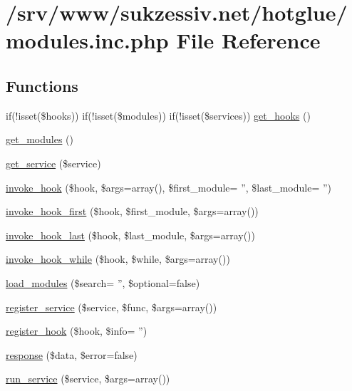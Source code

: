 \hypertarget{modules_8inc_8php}{
\section{/srv/www/sukzessiv.net/hotglue/modules.inc.php File Reference}
\label{modules_8inc_8php}
}
\subsection*{Functions}
\begin{DoxyCompactItemize}
\item 
if(!isset(\$hooks)) if(!isset(\$modules)) if(!isset(\$services)) \hyperlink{modules_8inc_8php_adcaa12e356133b7fa0670571698b38cc}{get\_\-hooks} ()
\item 
\hyperlink{modules_8inc_8php_a1b73e435e11b07906d0781b146b4aa21}{get\_\-modules} ()
\item 
\hyperlink{modules_8inc_8php_abf7633223c2fd4ecb199a8e0dc070802}{get\_\-service} (\$service)
\item 
\hyperlink{modules_8inc_8php_a92ef7c094f294cfec43a3bb53227a21a}{invoke\_\-hook} (\$hook, \$args=array(), \$first\_\-module= '', \$last\_\-module= '')
\item 
\hyperlink{modules_8inc_8php_acac937809bdb98ce29616134e43050ed}{invoke\_\-hook\_\-first} (\$hook, \$first\_\-module, \$args=array())
\item 
\hyperlink{modules_8inc_8php_ae1ff036fae9d272fe1d58dff8a9caed2}{invoke\_\-hook\_\-last} (\$hook, \$last\_\-module, \$args=array())
\item 
\hyperlink{modules_8inc_8php_a66473fc9f24153d85053f1f9c6ed83e4}{invoke\_\-hook\_\-while} (\$hook, \$while, \$args=array())
\item 
\hyperlink{modules_8inc_8php_a23f8be02dc2148a3c860119a1d6ea276}{load\_\-modules} (\$search= '', \$optional=false)
\item 
\hyperlink{modules_8inc_8php_ae6ed600fb2ce39a4b0837bbb01fe8d6e}{register\_\-service} (\$service, \$func, \$args=array())
\item 
\hyperlink{modules_8inc_8php_ad91a5f96df0655d782404170324e567d}{register\_\-hook} (\$hook, \$info= '')
\item 
\hyperlink{modules_8inc_8php_a361058ff2a03c098045c4442440a2574}{response} (\$data, \$error=false)
\item 
\hyperlink{modules_8inc_8php_a3d581f1636df2e24ffe7b013a12fb1db}{run\_\-service} (\$service, \$args=array())
\end{DoxyCompactItemize}


